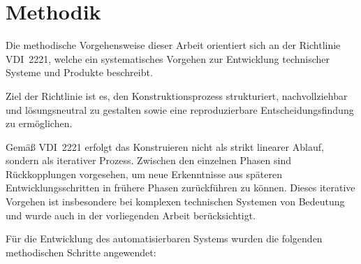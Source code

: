 \section{Methodik}

Die methodische Vorgehensweise dieser Arbeit orientiert sich an der Richtlinie 
VDI~2221, welche ein systematisches Vorgehen zur Entwicklung technischer Systeme 
und Produkte beschreibt.\cite{VDI2221, MKon_VL}

Ziel der Richtlinie ist es, den Konstruktionsprozess 
strukturiert, nachvollziehbar und lösungsneutral zu gestalten sowie eine 
reproduzierbare Entscheidungsfindung zu ermöglichen.

Gemäß VDI~2221 erfolgt das Konstruieren nicht als strikt linearer Ablauf, sondern 
als iterativer Prozess. Zwischen den einzelnen Phasen sind Rückkopplungen vorgesehen, 
um neue Erkenntnisse aus späteren Entwicklungsschritten in frühere Phasen 
zurückführen zu können. Dieses iterative Vorgehen ist insbesondere bei komplexen 
technischen Systemen von Bedeutung und wurde auch in der vorliegenden Arbeit 
berücksichtigt.

Für die Entwicklung des automatisierbaren Systems wurden die folgenden 
methodischen Schritte angewendet:

